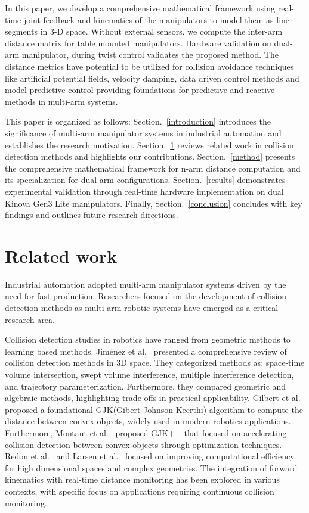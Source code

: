 \documentclass[10pt,twocolumn]{ICCAS}
\begin{document}
In this paper, we develop a comprehensive mathematical framework using real-time joint feedback and kinematics of the manipulators to model them as line segments in 3-D space. Without external sensors, we compute the inter-arm distance matrix for table mounted manipulators. Hardware validation on dual-arm manipulator, during twist control validates the proposed method. The distance metrics have potential to be utilized for collision avoidance techniques like artificial potential fields, velocity damping, data driven control methods and model predictive control providing foundations for predictive and reactive methods in multi-arm systems.

This paper is organized as follows: Section.~\ref{introduction} introduces the significance of multi-arm manipulator systems in industrial automation and establishes the research motivation. Section.~\ref{background} reviews related work in collision detection methods and highlights our contributions. Section.~\ref{method} presents the comprehensive mathematical framework for n-arm distance computation and its specialization for dual-arm configurations. Section.~\ref{results} demonstrates experimental validation through real-time hardware implementation on dual Kinova Gen3 Lite manipulators. Finally, Section.~\ref{conclusion} concludes with key findings and outlines future research directions.
\section{Related work}
\label{background}
Industrial automation adopted multi-arm manipulator systems driven by the need for fast production. Researchers focused on the development of collision detection methods as multi-arm robotic systems have emerged as a critical research area.

Collision detection studies in robotics have ranged from geometric methods to learning based methods. Jiménez et al.~\cite{jimenez20013d} presented a comprehensive review of collision detection methods in 3D space. They categorized methods as: space-time volume intersection, swept volume interference, multiple interference detection, and trajectory parameterization. Furthermore, they compared geometric and algebraic methods, highlighting trade-offs in practical applicability. Gilbert et al.~\cite{2083} proposed a foundational GJK(Gibert-Johnson-Keerthi) algorithm to compute the distance between convex objects, widely used in modern robotics applications. Furthermore, Montaut et al.~\cite{10494919} proposed GJK++ that focused on accelerating collision detection between convex objects through optimization techniques. Redon et al.~\cite{asme} and Larsen et al.~\cite{larsen2000fast} focused on improving computational efficiency for high dimensional spaces and complex geometries. The integration of forward kinematics with real-time distance monitoring has been explored in various contexts, with specific focus on applications requiring continuous collision monitoring.
\end{document}
